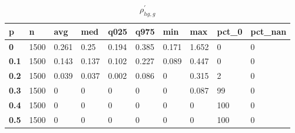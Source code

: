 \begin{table}[h]
 \centering 
\footnotesize
\caption{$\rho_{hg,g}^\prime $}
\label{tab:alphahgg}
\begin{tabular}[h]{|l|l|l|l|l|l|l|l|l|l|
    } \hline
\textbf{ p} & \textbf{ n} & \textbf{ avg} & \textbf{ med} & \textbf{ q025} & \textbf{ q975} & \textbf{ min} & \textbf{ max} & \textbf{ pct\_0} & \textbf{ pct\_nan}
    \\ \hline
  \textbf{  0} & 1500 & 0.261 &  0.25 & 0.194 & 0.385 & 0.171 & 1.652 &   0 & 0
    \\ \hline
  \textbf{0.1} & 1500 & 0.143 & 0.137 & 0.102 & 0.227 & 0.089 & 0.447 &   0 & 0
    \\ \hline
  \textbf{0.2} & 1500 & 0.039 & 0.037 & 0.002 & 0.086 &     0 & 0.315 &   2 & 0
    \\ \hline
  \textbf{0.3} & 1500 &     0 &     0 &     0 &     0 &     0 & 0.087 &  99 & 0
    \\ \hline
  \textbf{0.4} & 1500 &     0 &     0 &     0 &     0 &     0 &     0 & 100 & 0
    \\ \hline
  \textbf{0.5} & 1500 &     0 &     0 &     0 &     0 &     0 &     0 & 100 & 0
    \\ \hline
 \end{tabular}
 \end{table}

